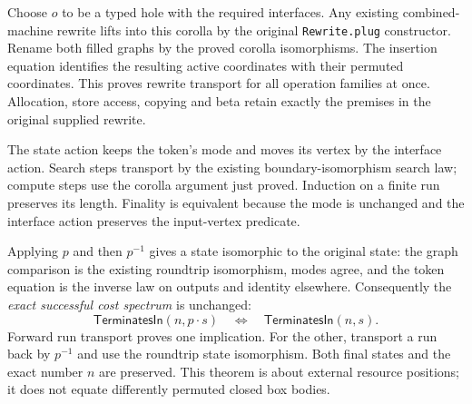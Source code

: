 
Choose $o$ to be a typed hole with the required interfaces. Any existing
combined-machine rewrite lifts into this corolla by the original
\texttt{Rewrite.plug} constructor. Rename both filled graphs by the proved
corolla isomorphisms. The insertion equation identifies the resulting active
coordinates with their permuted coordinates. This proves rewrite transport
for all operation families at once. Allocation, store access, copying and
beta retain exactly the premises in the original supplied rewrite.

The state action keeps the token's mode and moves its vertex by the interface
action. Search steps transport by the existing boundary-isomorphism search
law; compute steps use the corolla argument just proved. Induction on a finite
run preserves its length. Finality is equivalent because the mode is unchanged
and the interface action preserves the input-vertex predicate.


Applying $p$ and then $p^{-1}$ gives a state isomorphic to the original state:
the graph comparison is the existing roundtrip isomorphism, modes agree, and
the token equation is the inverse law on outputs and identity elsewhere.
Consequently the \emph{exact successful cost spectrum} is unchanged:
\[
 \mathsf{TerminatesIn}(n,p\cdot s)
 \quad\Longleftrightarrow\quad \mathsf{TerminatesIn}(n,s).
\]
Forward run transport proves one implication. For the other, transport a run
back by $p^{-1}$ and use the roundtrip state isomorphism. Both final states and
the exact number $n$ are preserved. This theorem is about external resource
positions; it does not equate differently permuted closed box bodies.


